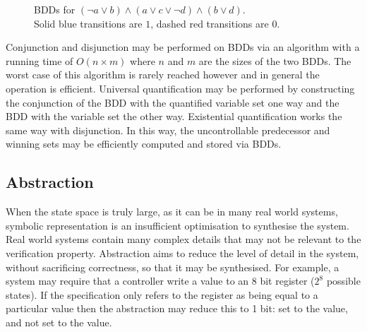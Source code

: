 \begin{figure}
\begin{subfigure}[t]{0.5\textwidth}
    \end{subfigure}
    \caption[Example BDD]{BDDs for $(\lnot a \lor b) \land (a \lor c \lor  \lnot d) \land (b \lor d)$. \\Solid blue transitions are $1$, dashed red transitions are $0$.}
    \label{fig:backgroundBDD}
\end{figure}

Conjunction and disjunction may be performed on BDDs via an algorithm with a running time of $O(n \times m)$ where $n$ and $m$ are the sizes of the two BDDs. The worst case of this algorithm is rarely reached however and in general the operation is efficient. Universal quantification may be performed by constructing the conjunction of the BDD with the quantified variable set one way and the BDD with the variable set the other way. Existential quantification works the same way with disjunction. In this way, the uncontrollable predecessor and winning sets may be efficiently computed and stored via BDDs.

\subsection{Abstraction}

When the state space is truly large, as it can be in many real world systems, symbolic representation is an insufficient optimisation to synthesise the system. Real world systems contain many complex details that may not be relevant to the verification property. Abstraction aims to reduce the level of detail in the system, without sacrificing correctness, so that it may be synthesised. For example, a system may require that a controller write a value to an 8 bit register ($2^8$ possible states). If the specification only refers to the register as being equal to a particular value then the abstraction may reduce this to 1 bit: set to the value, and not set to the value.

